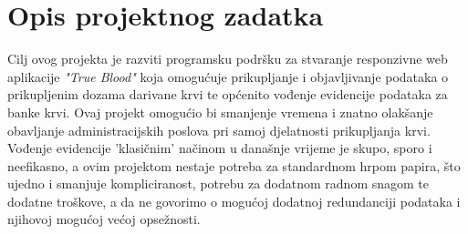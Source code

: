 \chapter{Opis projektnog zadatka}
		
		Cilj ovog projekta je razviti programsku podršku za stvaranje responzivne web aplikacije \textit{"True Blood"} koja omogućuje prikupljanje i objavljivanje podataka o prikupljenim dozama darivane krvi te općenito vođenje evidencije podataka za banke krvi.
		Ovaj projekt omogućio bi smanjenje vremena i znatno olakšanje obavljanje administracijskih poslova pri samoj djelatnosti prikupljanja krvi. Vođenje evidencije 'klasičnim' načinom u današnje vrijeme je skupo, sporo i neefikasno, a ovim projektom nestaje potreba za standardnom hrpom papira, što ujedno i smanjuje kompliciranost, potrebu za dodatnom radnom snagom te dodatne troškove, a da ne govorimo o mogućoj dodatnoj redundanciji podataka i njihovoj mogućoj većoj opsežnosti.\\
		
